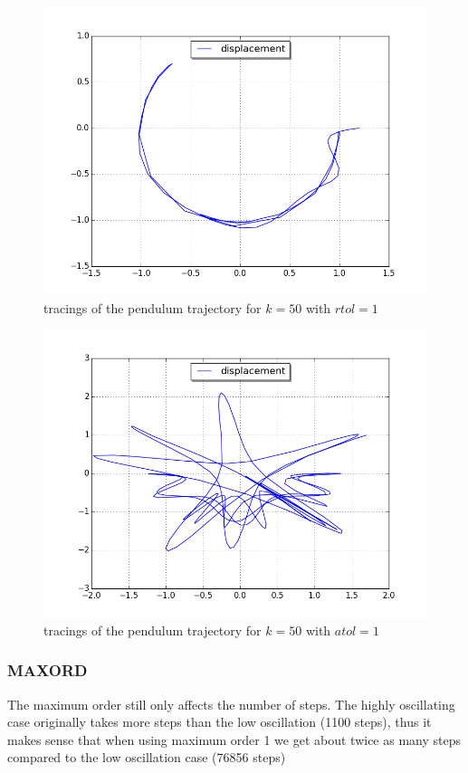 \documentclass[a4paper,11pt]{article}
\theoremstyle{mytheor}
\begin{document}
\begin{figure}[!h]
\centering
\includegraphics[scale=0.5]{task1_k50_utdrag12_atol01.png}
\caption{tracings of the pendulum trajectory for $k = 50$ with $rtol = 1$}
\label{3k10rt01}
\end{figure}

\begin{figure}[!h]
\centering
\includegraphics[scale=0.5]{task1_k50_utdrag12_rtol01.png}
\caption{tracings of the pendulum trajectory for $k = 50$ with $atol = 1$}
\label{3k10at01}
\end{figure}

\subsubsection*{MAXORD}
The maximum order still only affects the number of steps. The highly oscillating case originally takes more steps than the low oscillation (1100 steps), thus it makes sense that when using maximum order 1 we get about twice as many steps compared to the low oscillation case (76856 steps)
\end{document}
